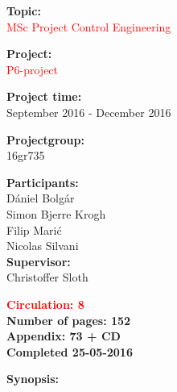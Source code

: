 \begin{minipage}[t]{0.48\textwidth}
\textbf{Topic:} \\[5pt]\bigskip\hspace{2ex}\textcolor{red}{MSc Project Control Engineering}

\textbf{Project:} \\[5pt]\bigskip\hspace{2ex}
\textcolor{red}{P6-project}

\textbf{Project time:} \\[5pt]\bigskip\hspace{2ex}
September 2016 - December 2016

\textbf{Projectgroup:} \\[5pt]\bigskip\hspace{2ex}
16gr735	

\textbf{Participants:} \\[5pt]\hspace*{2ex}
Dániel Bolgár \\\hspace*{2ex}
Simon Bjerre Krogh \\\hspace*{2ex}
Filip Marić\\\hspace*{2ex}
Nicolas Silvani \\

\textbf{Supervisor:} \\[5pt]\hspace*{2ex}
Christoffer Sloth \\\bigskip\hspace{2ex}

\vspace*{3.5cm}

\textcolor{red}{\textbf{Circulation: 8}}\\
\textbf{Number of pages: 152}\\
\textbf{Appendix: 73 + CD} \\
\textbf{Completed 25-05-2016}\\
\end{minipage}
\hfill
\begin{minipage}[t]{0.483\textwidth}
\textbf{Synopsis:} \\[5pt]
\fbox{\parbox{7cm}{\bigskip\bigskip}}
\end{minipage}

\vfill

